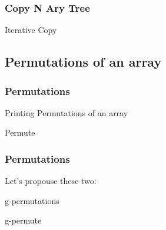 \documentclass{beamer}
\begin{document}
\begin{frame}
	\frametitle{Copy N Ary Tree}
	\begin{block}{Iterative Copy}
		\begin{algorithmic}[1]
				\State {}
			\EndProcedure
		\end{algorithmic}
	\end{block}
\end{frame}
\subsection{Permutations of an array}
\begin{frame}
	\frametitle{Permutations}
	\begin{block}{Printing Permutations of an array}
		\tiny
		\begin{algorithmic}[1]
					\State \Return {$[a]$}
				\Else
					\State {}
				\EndIf
			 \EndProcedure
		\end{algorithmic}
	\end{block}
	\begin{block}{Permute}
		\tiny
		\begin{algorithmic}[1]
					\State \Return{$[]$}
				\Else
					\State {}
				\EndIf
			\EndProcedure
		\end{algorithmic}
	\end{block}
\end{frame}
\begin{frame}
	\frametitle{Permutations}
	Let's propouse these two:
	\begin{block}{g-permutations}
		\begin{algorithmic}[1]
				\State {}
			\EndProcedure
		\end{algorithmic}
	\end{block}
	\begin{block}{g-permute}
		\begin{algorithmic}[1]
				\State {}
			\EndProcedure
		\end{algorithmic}
	\end{block}
\end{frame}
\end{document}
